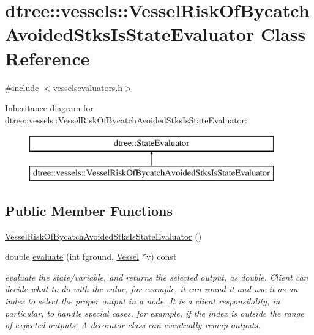 \hypertarget{classdtree_1_1vessels_1_1_vessel_risk_of_bycatch_avoided_stks_is_state_evaluator}{}\section{dtree\+::vessels\+::Vessel\+Risk\+Of\+Bycatch\+Avoided\+Stks\+Is\+State\+Evaluator Class Reference}
\label{classdtree_1_1vessels_1_1_vessel_risk_of_bycatch_avoided_stks_is_state_evaluator}


{\ttfamily \#include $<$vesselsevaluators.\+h$>$}

Inheritance diagram for dtree\+::vessels\+::Vessel\+Risk\+Of\+Bycatch\+Avoided\+Stks\+Is\+State\+Evaluator\+:\begin{figure}[H]
\begin{center}
\leavevmode
\includegraphics[height=2.000000cm]{da/dc2/classdtree_1_1vessels_1_1_vessel_risk_of_bycatch_avoided_stks_is_state_evaluator}
\end{center}
\end{figure}
\subsection*{Public Member Functions}
\begin{DoxyCompactItemize}
\item 
\mbox{\hyperlink{classdtree_1_1vessels_1_1_vessel_risk_of_bycatch_avoided_stks_is_state_evaluator_a77a29543ae2bb5d570a97efe2b56fd8a}{Vessel\+Risk\+Of\+Bycatch\+Avoided\+Stks\+Is\+State\+Evaluator}} ()
\item 
double \mbox{\hyperlink{classdtree_1_1vessels_1_1_vessel_risk_of_bycatch_avoided_stks_is_state_evaluator_a12997277339c2d910e6136fee1923044}{evaluate}} (int fground, \mbox{\hyperlink{class_vessel}{Vessel}} $\ast$v) const
\begin{DoxyCompactList}\small\item\em evaluate the state/variable, and returns the selected output, as double. Client can decide what to do with the value, for example, it can round it and use it as an index to select the proper output in a node. It is a client responsibility, in particular, to handle special cases, for example, if the index is outside the range of expected outputs. A decorator class can eventually remap outputs. \end{DoxyCompactList}\end{DoxyCompactItemize}


